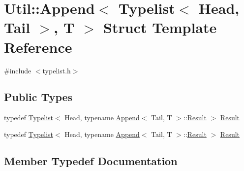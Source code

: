 \hypertarget{structUtil_1_1TL_1_1Append_3_01Typelist_3_01Head_00_01Tail_01_4_00_01T_01_4}{}\section{Util\+:\+:Append$<$ Typelist$<$ Head, Tail $>$, T $>$ Struct Template Reference}
\label{structUtil_1_1TL_1_1Append_3_01Typelist_3_01Head_00_01Tail_01_4_00_01T_01_4}


{\ttfamily \#include $<$typelist.\+h$>$}

\subsection*{Public Types}
\begin{DoxyCompactItemize}
\item 
typedef \mbox{\hyperlink{structUtil_1_1Typelist}{Typelist}}$<$ Head, typename \mbox{\hyperlink{structUtil_1_1TL_1_1Append}{Append}}$<$ Tail, T $>$\+::\mbox{\hyperlink{structUtil_1_1TL_1_1Append_3_01Typelist_3_01Head_00_01Tail_01_4_00_01T_01_4_ae4e9d942296ff4d7021b2482ec712082}{Result}} $>$ \mbox{\hyperlink{structUtil_1_1TL_1_1Append_3_01Typelist_3_01Head_00_01Tail_01_4_00_01T_01_4_ae4e9d942296ff4d7021b2482ec712082}{Result}}
\item 
typedef \mbox{\hyperlink{structUtil_1_1Typelist}{Typelist}}$<$ Head, typename \mbox{\hyperlink{structUtil_1_1TL_1_1Append}{Append}}$<$ Tail, T $>$\+::\mbox{\hyperlink{structUtil_1_1TL_1_1Append_3_01Typelist_3_01Head_00_01Tail_01_4_00_01T_01_4_ae4e9d942296ff4d7021b2482ec712082}{Result}} $>$ \mbox{\hyperlink{structUtil_1_1TL_1_1Append_3_01Typelist_3_01Head_00_01Tail_01_4_00_01T_01_4_ae4e9d942296ff4d7021b2482ec712082}{Result}}
\end{DoxyCompactItemize}


\subsection{Member Typedef Documentation}
\mbox{\label{structUtil_1_1TL_1_1Append_3_01Typelist_3_01Head_00_01Tail_01_4_00_01T_01_4_ae4e9d942296ff4d7021b2482ec712082}} 
